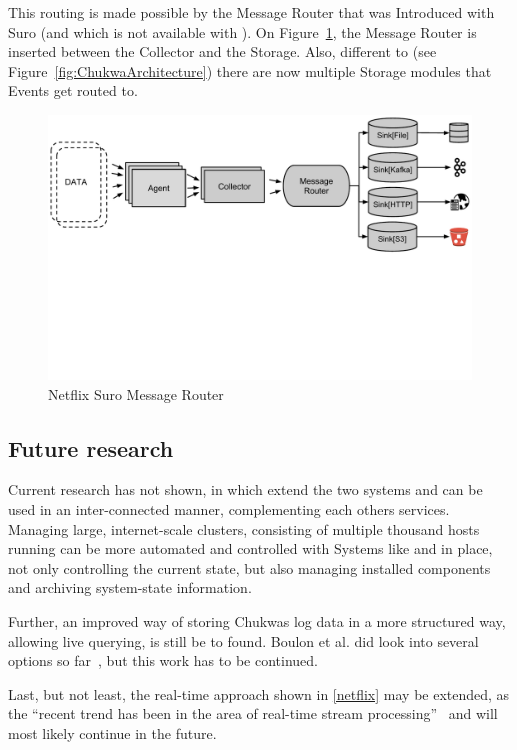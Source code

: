 This routing is made possible by the Message Router that was Introduced with Suro (and which is not available with \chuk). On Figure~\ref{fig:SuroMessageRouter}, the Message Router is inserted between the Collector and the Storage. Also, different to \chuk (see Figure~\ref{fig:ChukwaArchitecture}) there are now multiple Storage modules that Events get routed to.
\begin{figure}[hbt]
  \centering
  \includegraphics[width=\linewidth,clip=true,trim=0 75mm 0 0]{images/SuroMessageRouter}
  \caption{Netflix Suro Message Router~\cite{Bae2013}}
  \label{fig:SuroMessageRouter}
\end{figure}


\subsection{Future research}
Current research has not shown, in which extend the two systems \amblong and \chuk can be used in an inter-connected manner, complementing each others services. 
Managing large, internet-scale clusters, consisting of multiple thousand hosts running \hadooplong can be more automated and controlled with Systems like \amb and \chuk in place, not only controlling the current state, but also managing installed components and archiving system-state information.

Further, an improved way of storing Chukwas log data in a more structured way, allowing live querying, is still be to found. Boulon et al. did look into several options so far~\cite{Boulonb}, but this work has to be continued.

Last, but not least, the real-time approach shown in \ref{netflix} may be extended, as the ``recent trend has been in the area of real-time stream processing''~\cite{Bae2013} and will most likely continue in the future.